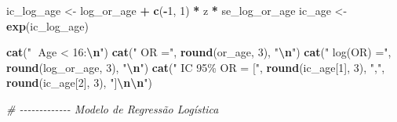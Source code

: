 \documentclass[
]{article}
\newenvironment{Shaded}{\begin{snugshade}}{\end{snugshade}}
\newcommand{\CommentTok}[1]{\textcolor[rgb]{0.56,0.35,0.01}{\textit{#1}}}
\newcommand{\DecValTok}[1]{\textcolor[rgb]{0.00,0.00,0.81}{#1}}
\newcommand{\FunctionTok}[1]{\textcolor[rgb]{0.13,0.29,0.53}{\textbf{#1}}}
\newcommand{\NormalTok}[1]{#1}
\newcommand{\OtherTok}[1]{\textcolor[rgb]{0.56,0.35,0.01}{#1}}
\newcommand{\SpecialCharTok}[1]{\textcolor[rgb]{0.81,0.36,0.00}{\textbf{#1}}}
\newcommand{\StringTok}[1]{\textcolor[rgb]{0.31,0.60,0.02}{#1}}
\begin{document}
\begin{Shaded}
\begin{Highlighting}[]
\NormalTok{ic\_log\_age }\OtherTok{\textless{}{-}}\NormalTok{ log\_or\_age }\SpecialCharTok{+} \FunctionTok{c}\NormalTok{(}\SpecialCharTok{{-}}\DecValTok{1}\NormalTok{, }\DecValTok{1}\NormalTok{) }\SpecialCharTok{*}\NormalTok{ z }\SpecialCharTok{*}\NormalTok{ se\_log\_or\_age}
\NormalTok{ic\_age }\OtherTok{\textless{}{-}} \FunctionTok{exp}\NormalTok{(ic\_log\_age)}

\FunctionTok{cat}\NormalTok{(}\StringTok{"🔹 Age \textless{} 16:}\SpecialCharTok{\textbackslash{}n}\StringTok{"}\NormalTok{)}
\FunctionTok{cat}\NormalTok{(}\StringTok{"  OR ="}\NormalTok{, }\FunctionTok{round}\NormalTok{(or\_age, }\DecValTok{3}\NormalTok{), }\StringTok{"}\SpecialCharTok{\textbackslash{}n}\StringTok{"}\NormalTok{)}
\FunctionTok{cat}\NormalTok{(}\StringTok{"  log(OR) ="}\NormalTok{, }\FunctionTok{round}\NormalTok{(log\_or\_age, }\DecValTok{3}\NormalTok{), }\StringTok{"}\SpecialCharTok{\textbackslash{}n}\StringTok{"}\NormalTok{)}
\FunctionTok{cat}\NormalTok{(}\StringTok{"  IC 95\% OR = ["}\NormalTok{, }\FunctionTok{round}\NormalTok{(ic\_age[}\DecValTok{1}\NormalTok{], }\DecValTok{3}\NormalTok{), }\StringTok{","}\NormalTok{, }\FunctionTok{round}\NormalTok{(ic\_age[}\DecValTok{2}\NormalTok{], }\DecValTok{3}\NormalTok{), }\StringTok{"]}\SpecialCharTok{\textbackslash{}n\textbackslash{}n}\StringTok{"}\NormalTok{)}

\CommentTok{\# {-}{-}{-}{-}{-}{-}{-}{-}{-}{-}{-}{-}{-} Modelo de Regressão Logística}
\end{Highlighting}
\end{Shaded}
\end{document}
